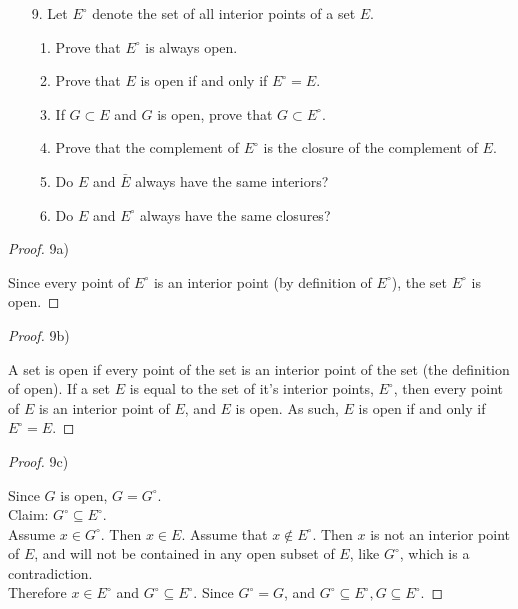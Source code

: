 \documentclass[10pt]{article}
\theoremstyle{definition}
\theoremstyle{plain}
\begin{document}
\begin{enumerate}
\item[9.] Let $E^\circ$ denote the set of all interior points of a set $E$.
\begin{enumerate}
  \item Prove that $E^\circ$ is always open.
  \item Prove that $E$ is open if and only if $E^\circ = E$.
  \item If $G \subset E$ and $G$ is open, prove that $G\subset E^\circ$.
  \item Prove that the complement of $E^\circ$ is the closure of the complement of $E$.
  \item Do $E$ and $\bar{E}$ always have the same interiors?
  \item Do $E$ and $E^\circ$ always have the same closures?
\end{enumerate}
\end{enumerate}

\begin{proof}
9a)

Since every point of $E^\circ$ is an interior point (by definition of $E^\circ$), the set $E^\circ$ is open.
\end{proof}

\begin{proof}
9b)

A set is open if every point of the set is an interior point of the set (the definition of open). If a set $E$ is equal to the set of it's interior points, $E^\circ$, then every point of $E$ is an interior point of $E$, and $E$ is open. As such, $E$ is open if and only if $E^\circ = E$.
\end{proof}

\begin{proof}
9c)

Since $G$ is open, $G=G^\circ$. \\

Claim: $G^\circ \subseteq E^\circ$. \\

Assume $x\in G^\circ$. Then $x\in E$.
Assume that $x\not\in E^\circ.$ Then $x$ is not an interior point of $E$, and will not be contained in any open subset of $E$, like $G^\circ$, which is a contradiction. \\

Therefore $x\in E^\circ$ and $G^\circ \subseteq E^\circ$. Since $G^\circ = G$, and $G^\circ \subseteq E^\circ, G\subseteq E^\circ$.
\end{proof}
\end{document}
